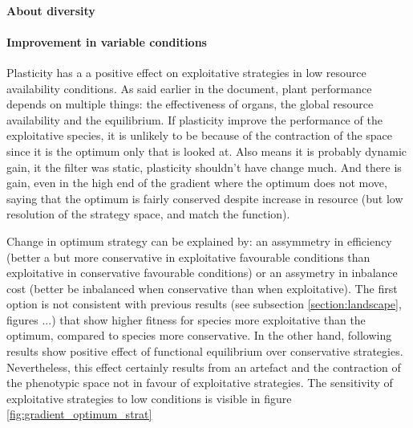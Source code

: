 





\paragraph{About diversity}


\paragraph{Improvement in variable conditions}
Plasticity has a a positive effect on exploitative strategies in low resource availability conditions. As said earlier in the document, plant performance depends on multiple things: the effectiveness of organs, the global resource availability and the equilibrium. 
If plasticity improve the performance of the exploitative species, it is unlikely to be because of the contraction of the space since it is the optimum only that is looked at. Also means it is probably dynamic gain, it the filter was static, plasticity shouldn't have change much. And there is gain, even in the high end of the gradient where the optimum does not move, saying that the optimum is fairly conserved despite increase in resource (but low resolution of the strategy space, and match the function). 

Change in optimum strategy can be explained by: an assymmetry in efficiency (better a but more conservative in exploitative favourable conditions than exploitative in conservative favourable conditions) or an assymetry in inbalance cost (better be inbalanced when conservative than when exploitative). The first option is not consistent with previous results (see subsection \ref{section:landscape}, figures ...) that show higher fitness for species more exploitative than the optimum, compared to species more conservative. In the other hand, following results show positive effect of functional equilibrium over conservative strategies. Nevertheless, this effect certainly results from an artefact and the contraction of the phenotypic space not in favour of exploitative strategies. The sensitivity of exploitative strategies to low conditions is visible in figure \ref{fig:gradient_optimum_strat}

